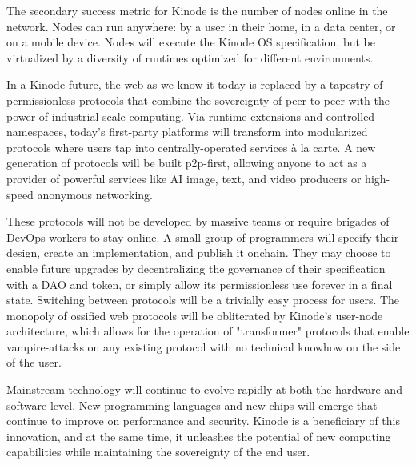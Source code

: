 \documentclass[runningheads]{llncs}
\begin{document}
The secondary success metric for Kinode is the number of nodes online in the network.
Nodes can run anywhere: by a user in their home, in a data center, or on a mobile device.
Nodes will execute the Kinode OS specification, but be virtualized by a diversity of runtimes optimized for different environments.

In a Kinode future, the web as we know it today is replaced by a tapestry of permissionless protocols that combine the sovereignty of peer-to-peer with the power of industrial-scale computing.
Via runtime extensions and controlled namespaces, today's first-party platforms will transform into modularized protocols where users tap into centrally-operated services à la carte.
A new generation of protocols will be built p2p-first, allowing anyone to act as a provider of powerful services like AI image, text, and video producers or high-speed anonymous networking.

These protocols will not be developed by massive teams or require brigades of DevOps workers to stay online.
A small group of programmers will specify their design, create an implementation, and publish it onchain.
They may choose to enable future upgrades by decentralizing the governance of their specification with a DAO and token, or simply allow its permissionless use forever in a final state.
Switching between protocols will be a trivially easy process for users.
The monopoly of ossified web protocols will be obliterated by Kinode's user-node architecture, which allows for the operation of "transformer" protocols that enable vampire-attacks on any existing protocol with no technical knowhow on the side of the user.

Mainstream technology will continue to evolve rapidly at both the hardware and software level. New programming languages and new chips will emerge that continue to improve on performance and security.
Kinode is a beneficiary of this innovation, and at the same time, it unleashes the potential of new computing capabilities while maintaining the sovereignty of the end user.
\end{document}

